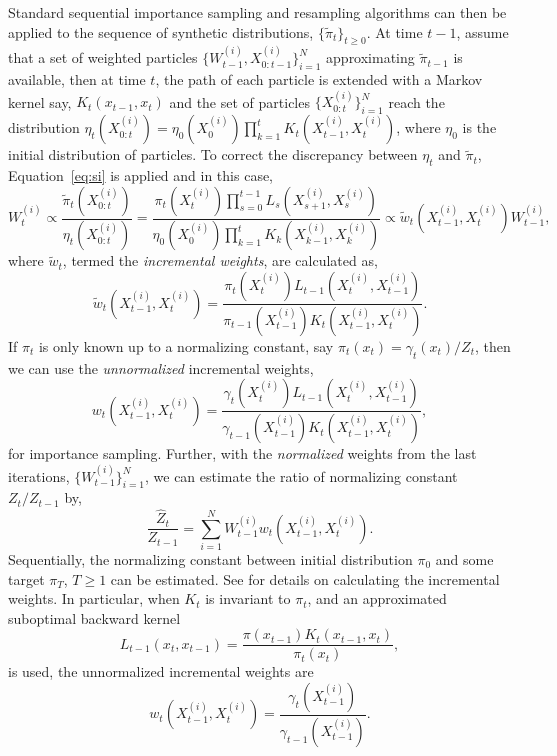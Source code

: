 \documentclass[11pt, fontset=Minion, showoverfull,
bib, mintcode, minted=cache]{marticle}
\begin{document}
Standard sequential importance sampling and resampling algorithms can then be
applied to the sequence of synthetic distributions, $\{\tilde\pi_t\}_{t\ge0}$.
At time $t - 1$, assume that a set of weighted particles
$\{W_{t-1}^{(i)},X_{0:t-1}^{(i)}\}_{i=1}^N$ approximating $\tilde\pi_{t-1}$ is
available, then at time $t$, the path of each particle is extended with a
Markov kernel say, $K_t(x_{t-1}, x_t)$ and the set of particles
$\{X_{0:t}^{(i)}\}_{i=1}^N$ reach the distribution $\eta_t(X_{0:t}^{(i)}) =
\eta_0(X_0^{(i)})\prod_{k=1}^tK_t(X_{t-1}^{(i)}, X_t^{(i)})$, where $\eta_0$
is the initial distribution of particles. To correct the discrepancy between
$\eta_t$ and $\tilde\pi_t$, Equation~\ref{eq:si} is applied and in this case,
\begin{equation}
  W_t^{(i)} \propto \frac{\tilde\pi_t(X_{0:t}^{(i)})}{\eta_t(X_{0:t}^{(i)})}
  = \frac{\pi_t(X_t^{(i)})\prod_{s=0}^{t-1}L_s(X_{s+1}^{(i)}, X_s^{(i)})}
  {\eta_0(X_0^{(i)})\prod_{k=1}^tK_k(X_{k-1}^{(i)},X_k^{(i)})}
  \propto \tilde{w}_t(X_{t-1}^{(i)}, X_t^{(i)})W_{t-1}^{(i)},
\end{equation}
where $\tilde{w}_t$, termed the \emph{incremental weights}, are calculated as,
\begin{equation}
  \tilde{w}_t(X_{t-1}^{(i)},X_t^{(i)}) =
  \frac{\pi_t(X_t^{(i)})L_{t-1}(X_t^{(i)}, X_{t-1}^{(i)})}
  {\pi_{t-1}(X_{t-1}^{(i)})K_t(X_{t-1}^{(i)}, X_t^{(i)})}.
\end{equation}
If $\pi_t$ is only known up to a normalizing constant, say $\pi_t(x_t) =
\gamma_t(x_t)/Z_t$, then we can use the \emph{unnormalized} incremental
weights,
\begin{equation}
  w_t(X_{t-1}^{(i)},X_t^{(i)}) =
  \frac{\gamma_t(X_t^{(i)})L_{t-1}(X_t^{(i)}, X_{t-1}^{(i)})}
  {\gamma_{t-1}(X_{t-1}^{(i)})K_t(X_{t-1}^{(i)}, X_t^{(i)})},
\end{equation}
for importance sampling. Further, with the \emph{normalized} weights from the
last iterations, $\{W_{t-1}^{(i)}\}_{i=1}^N$, we can estimate the ratio of
normalizing constant $Z_t/Z_{t-1}$ by,
\begin{equation}
  \frac{\hat{Z}_t}{Z_{t-1}} =
  \sum_{i=1}^N W_{t-1}^{(i)}w_t(X_{t-1}^{(i)},X_t^{(i)}).
\end{equation}
Sequentially, the normalizing constant between initial distribution $\pi_0$
and some target $\pi_T$, $T\ge1$ can be estimated. See
\textcite{DelMoral:2006hc} for details on  calculating the incremental
weights. In particular, when $K_t$ is invariant to $\pi_t$, and an
approximated suboptimal backward kernel
\begin{equation}
  L_{t-1}(x_t, x_{t-1}) = \frac{\pi(x_{t-1})K_t(x_{t-1}, x_t)}{\pi_t(x_t)},
\end{equation}
is used, the unnormalized incremental weights are
\begin{equation}
  w_t(X_{t-1}^{(i)},X_t^{(i)}) =
  \frac{\gamma_t(X_{t-1}^{(i)})}{\gamma_{t-1}(X_{t-1}^{(i)})}.
  \label{eq:inc_weight_mcmc}
\end{equation}
\end{document}
